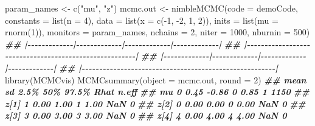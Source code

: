 \documentclass[
  12pt,
]{krantz}
\newenvironment{Shaded}{\begin{snugshade}}{\end{snugshade}}
\newcommand{\AttributeTok}[1]{\textcolor[rgb]{0.77,0.63,0.00}{#1}}
\newcommand{\DecValTok}[1]{\textcolor[rgb]{0.00,0.00,0.81}{#1}}
\newcommand{\DocumentationTok}[1]{\textcolor[rgb]{0.56,0.35,0.01}{\textbf{\textit{#1}}}}
\newcommand{\FunctionTok}[1]{\textcolor[rgb]{0.00,0.00,0.00}{#1}}
\newcommand{\NormalTok}[1]{#1}
\newcommand{\OtherTok}[1]{\textcolor[rgb]{0.56,0.35,0.01}{#1}}
\newcommand{\SpecialCharTok}[1]{\textcolor[rgb]{0.00,0.00,0.00}{#1}}
\newcommand{\StringTok}[1]{\textcolor[rgb]{0.31,0.60,0.02}{#1}}
\begin{document}
\begin{Shaded}
\begin{Highlighting}[]
\NormalTok{param\_names }\OtherTok{\textless{}{-}} \FunctionTok{c}\NormalTok{(}\StringTok{"mu"}\NormalTok{, }\StringTok{"z"}\NormalTok{)}
\NormalTok{mcmc.out }\OtherTok{\textless{}{-}} \FunctionTok{nimbleMCMC}\NormalTok{(}\AttributeTok{code =}\NormalTok{ demoCode, }
                      \AttributeTok{constants =} \FunctionTok{list}\NormalTok{(}\AttributeTok{n =} \DecValTok{4}\NormalTok{),}
                      \AttributeTok{data =} \FunctionTok{list}\NormalTok{(}\AttributeTok{x =} \FunctionTok{c}\NormalTok{(}\SpecialCharTok{{-}}\DecValTok{1}\NormalTok{, }\SpecialCharTok{{-}}\DecValTok{2}\NormalTok{, }\DecValTok{1}\NormalTok{, }\DecValTok{2}\NormalTok{)), }
                      \AttributeTok{inits =} \FunctionTok{list}\NormalTok{(}\AttributeTok{mu =} \FunctionTok{rnorm}\NormalTok{(}\DecValTok{1}\NormalTok{)),}
                      \AttributeTok{monitors =}\NormalTok{ param\_names,}
                      \AttributeTok{nchains =} \DecValTok{2}\NormalTok{, }
                      \AttributeTok{niter =} \DecValTok{1000}\NormalTok{,}
                      \AttributeTok{nburnin =} \DecValTok{500}\NormalTok{)}
\DocumentationTok{\#\# |{-}{-}{-}{-}{-}{-}{-}{-}{-}{-}{-}{-}{-}|{-}{-}{-}{-}{-}{-}{-}{-}{-}{-}{-}{-}{-}|{-}{-}{-}{-}{-}{-}{-}{-}{-}{-}{-}{-}{-}|{-}{-}{-}{-}{-}{-}{-}{-}{-}{-}{-}{-}{-}|}
\DocumentationTok{\#\# |{-}{-}{-}{-}{-}{-}{-}{-}{-}{-}{-}{-}{-}{-}{-}{-}{-}{-}{-}{-}{-}{-}{-}{-}{-}{-}{-}{-}{-}{-}{-}{-}{-}{-}{-}{-}{-}{-}{-}{-}{-}{-}{-}{-}{-}{-}{-}{-}{-}{-}{-}{-}{-}{-}{-}|}
\DocumentationTok{\#\# |{-}{-}{-}{-}{-}{-}{-}{-}{-}{-}{-}{-}{-}|{-}{-}{-}{-}{-}{-}{-}{-}{-}{-}{-}{-}{-}|{-}{-}{-}{-}{-}{-}{-}{-}{-}{-}{-}{-}{-}|{-}{-}{-}{-}{-}{-}{-}{-}{-}{-}{-}{-}{-}|}
\DocumentationTok{\#\# |{-}{-}{-}{-}{-}{-}{-}{-}{-}{-}{-}{-}{-}{-}{-}{-}{-}{-}{-}{-}{-}{-}{-}{-}{-}{-}{-}{-}{-}{-}{-}{-}{-}{-}{-}{-}{-}{-}{-}{-}{-}{-}{-}{-}{-}{-}{-}{-}{-}{-}{-}{-}{-}{-}{-}|}
\FunctionTok{library}\NormalTok{(MCMCvis)}
\FunctionTok{MCMCsummary}\NormalTok{(}\AttributeTok{object =}\NormalTok{ mcmc.out, }\AttributeTok{round =} \DecValTok{2}\NormalTok{)}
\DocumentationTok{\#\#      mean   sd  2.5\% 50\% 97.5\% Rhat n.eff}
\DocumentationTok{\#\# mu      0 0.45 {-}0.86   0  0.85    1  1150}
\DocumentationTok{\#\# z[1]    1 0.00  1.00   1  1.00  NaN     0}
\DocumentationTok{\#\# z[2]    0 0.00  0.00   0  0.00  NaN     0}
\DocumentationTok{\#\# z[3]    3 0.00  3.00   3  3.00  NaN     0}
\DocumentationTok{\#\# z[4]    4 0.00  4.00   4  4.00  NaN     0}
\end{Highlighting}
\end{Shaded}
\end{document}
